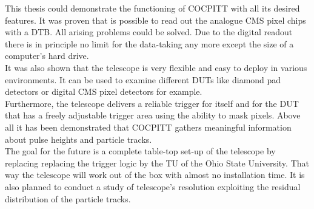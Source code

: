 This thesis could demonstrate the functioning of COCPITT with all its desired features. It was proven that is possible to read out the analogue CMS pixel chips with a \ac{DTB}. All arising problems could be solved. Due to the digital readout there is in principle no limit for the data-taking any more except the size of a computer's hard drive.\\
It was also shown that the telescope is very flexible and easy to deploy in various environments. It can be used to examine different \ac{DUT}s like diamond pad detectors or digital CMS pixel detectors for example.\\
Furthermore, the telescope delivers a reliable trigger for itself and for the \ac{DUT} that has a freely adjustable trigger area using the ability to mask pixels. Above all it has been demonstrated that COCPITT gathers meaningful information about pulse heights and particle tracks.\\
The goal for the future is a complete table-top set-up of the telescope by replacing replacing the trigger logic by the \ac{TU} of the Ohio State University. That way the telescope will work out of the box with almost no installation time. It is also planned to conduct a study of telescope's resolution exploiting the residual distribution of the particle tracks.
